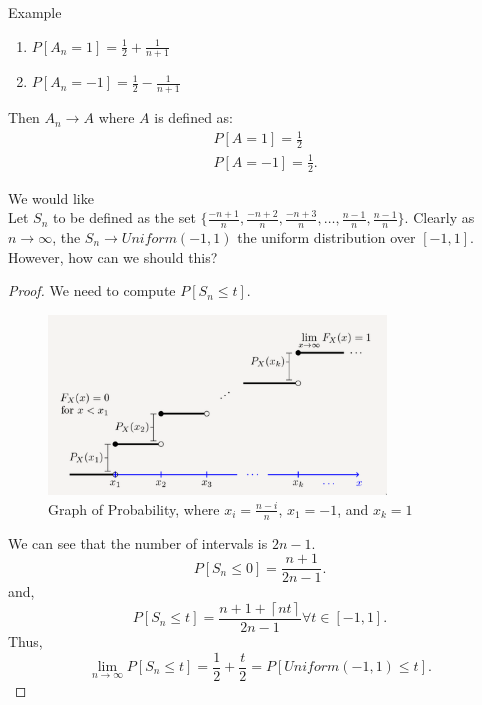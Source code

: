 \documentclass[a4paper]{article}
\begin{document}
\begin{note}{Example}\\
  \begin{enumerate}
    \item $P[A_n = 1] = \frac{1}{2} + \frac{1}{n+1}$ 
    \item $P[A_n = -1] = \frac{1}{2} - \frac{1}{n+1}$
  \end{enumerate}
  Then $A_n \to A$ where $A$ is defined as:
   \begin{align*}
     &P[A = 1] =\frac{1}{2} \\
     &P[A=-1] = \frac{1}{2} 
  .\end{align*}
\end{note}
\begin{note}{We would like}\\
  Let $S_n$ to be defined as the set  $\{\frac{-n + 1}{n}, \frac{-n + 2}{n}, \frac{-n+3}{n}, \ldots, \frac{n-1}{n}, \frac{n-1}{n}\}$. Clearly as $n \to \infty$, the  $S_n \to Uniform(-1,1)$ the uniform distribution over  $[-1,1]$. However, how can we should this? \\

   \begin{proof}
     We need to compute $P[S_n \leq t]$. 

\begin{figure}[h]
  \centering
  \includegraphics[width=0.8\textwidth]{assets/step_wise_cdf.png}
  \caption{Graph of Probability, where $x_i = \frac{n - i}{n}$, $x_1 = -1$, and  $x_k = 1$}
  \label{fig:step_wise_cdf}
\end{figure} 

  We can see that the number of intervals is $2n-1$.
  \[
    P[S_n \leq 0] = \frac{n+1}{2n-1}
  .\] 
  and,
  \[
    P[S_n \leq t] =\frac{n+1 + \left\lceil nt \right\rceil }{2n-1} \forall t \in [-1,1]
  .\] 
  Thus,
  \[
    \lim_{n \to \infty} P[S_n \leq t] = \frac{1}{2} + \frac{t}{2} = P[Uniform(-1,1) \leq t]
  .\] 
  \end{proof}
\end{note}
\end{document}
